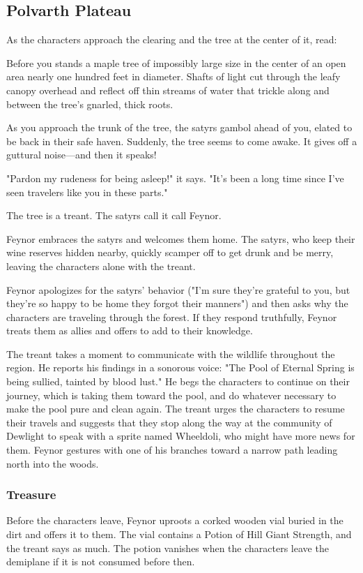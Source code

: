 \documentclass[10pt,a4paper,twoside,bg=print,twocolumn,openany,nodeprecatedcode]{dndbook}
\begin{document}
\subsection{Polvarth Plateau}
As the characters approach the clearing and the tree at the center of it, read:

\begin{DndReadAloud}{}
Before you stands a maple tree of impossibly large size in the center of an open area nearly one hundred feet in diameter. Shafts of light cut through the leafy canopy overhead and reflect off thin streams of water that trickle along and between the tree's gnarled, thick roots.

As you approach the trunk of the tree, the satyrs gambol ahead of you, elated to be back in their safe haven. Suddenly, the tree seems to come awake. It gives off a guttural noise—and then it speaks!

"Pardon my rudeness for being asleep!" it says. "It's been a long time since I've seen travelers like you in these parts."

\end{DndReadAloud}

The tree is a treant. The satyrs call it call Feynor.

Feynor embraces the satyrs and welcomes them home. The satyrs, who keep their wine reserves hidden nearby, quickly scamper off to get drunk and be merry, leaving the characters alone with the treant.

Feynor apologizes for the satyrs' behavior ("I'm sure they're grateful to you, but they're so happy to be home they forgot their manners") and then asks why the characters are traveling through the forest. If they respond truthfully, Feynor treats them as allies and offers to add to their knowledge.

The treant takes a moment to communicate with the wildlife throughout the region. He reports his findings in a sonorous voice: "The Pool of Eternal Spring is being sullied, tainted by blood lust." He begs the characters to continue on their journey, which is taking them toward the pool, and do whatever necessary to make the pool pure and clean again. The treant urges the characters to resume their travels and suggests that they stop along the way at the community of Dewlight to speak with a sprite named Wheeldoli, who might have more news for them. Feynor gestures with one of his branches toward a narrow path leading north into the woods.

\subsubsection{Treasure}
Before the characters leave, Feynor uproots a corked wooden vial buried in the dirt and offers it to them. The vial contains a Potion of Hill Giant Strength, and the treant says as much. The potion vanishes when the characters leave the demiplane if it is not consumed before then.
\end{document}
